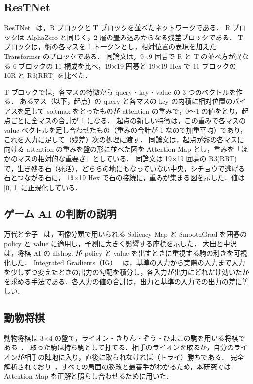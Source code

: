 \documentclass[submit]{ipsj}
\begin{document}
\subsection{ResTNet}
\label{sec:restnet}
ResTNet~\cite{restnet} は，R ブロックと T ブロックを並べたネットワークである．
R ブロックは AlphaZero と同じく，2 層の畳み込みからなる残差ブロックである．
T ブロックは，盤の各マスを 1 トークンとし，相対位置の表現を加えた Transformer のブロックである．
同論文は，9×9 囲碁で R と T の並べ方が異なる 6 ブロックの 11 構成を比べ，19×19 囲碁と 19×19 Hex で 10 ブロックの 10R と R3(RRT) を比べた．

T ブロックでは，各マスの特徴から query・key・value の 3 つのベクトルを作る．
あるマス（以下，起点）の query と各マスの key の内積に相対位置のバイアスを足して softmax をとったものが attention の重みで，0〜1 の値をとり，起点ごとに全マスの合計が 1 になる．
起点の新しい特徴は，この重みで各マスの value ベクトルを足し合わせたもの（重みの合計が 1 なので加重平均）であり，これを入力に足して（残差）次の処理に渡す．
同論文は，起点が盤の各マスに向ける attention の重みを盤の形に並べた図を Attention Map とし，重みを「ほかのマスの相対的な重要さ」としている．
同論文は 19×19 囲碁の R3(RRT) で，生き残る石（死活），どちらの地にもなっていない中央，シチョウで逃げる石とつながる石に，
19×19 Hex で石の接続に，重みが集まる図を示した．値は [0, 1] に正規化している．

\subsection{ゲーム AI の判断の説明}
万代と金子~\cite{mandai2018} は，画像分類で用いられる Saliency Map と SmoothGrad を囲碁の policy と value に適用し，予測に大きく影響する座標を示した．
大田と中沢~\cite{ota2024} は，将棋 AI の dlshogi が policy と value を出すときに重視する駒の利きを可視化した．
Integrated Gradients（IG）~\cite{ig} は，基準の入力から実際の入力まで入力を少しずつ変えたときの出力の勾配を積分し，各入力が出力にどれだけ効いたかを求める手法である．各入力の値の合計は，出力と基準の入力での出力の差に等しい．

\subsection{動物将棋}
動物将棋は 3×4 の盤で，ライオン・きりん・ぞう・ひよこの駒を用いる将棋である~\cite{tanaka2009}．
取った駒は持ち駒として打てる．相手のライオンを取るか，自分のライオンが相手の陣地に入り，直後に取られなければ（トライ）勝ちである．
完全解析されており~\cite{tanaka2009}，すべての局面の勝敗と最善手がわかるため，本研究では Attention Map を正解と照らし合わせるために用いた．
\end{document}
